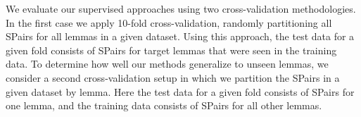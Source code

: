 \documentclass[11pt]{article}
\begin{document}
We evaluate our supervised approaches using two cross-validation
methodologies. In the first case we apply 10-fold cross-validation,
randomly partitioning all SPairs for all lemmas in a given
dataset. Using this approach, the test data for a given fold consists
of SPairs for target lemmas that were seen in the training data. To
determine how well our methods generalize to unseen lemmas, we
consider a second cross-validation setup in which we partition the
SPairs in a given dataset by lemma. Here the test data for a given
fold consists of SPairs for one lemma, and the training data consists
of SPairs for all other lemmas.







\end{document}
